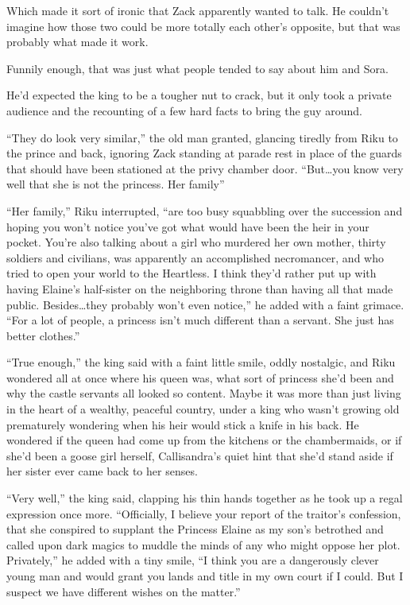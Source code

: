 Which made it sort of ironic that Zack apparently wanted to talk. He couldn't imagine how those two could be more totally each other's opposite, but that was probably what made it work.

Funnily enough, that was just what people tended to say about him and Sora.

He'd expected the king to be a tougher nut to crack, but it only took a private audience and the recounting of a few hard facts to bring the guy around.

``They do look very similar,'' the old man granted, glancing tiredly from Riku to the prince and back, ignoring Zack standing at parade rest in place of the guards that should have been stationed at the privy chamber door. ``But\ldots you know very well that she is not the princess. Her family\textemdash ''

``Her family,'' Riku interrupted, ``are too busy squabbling over the succession and hoping you won't notice you've got what would have been the heir in your pocket. You're also talking about a girl who murdered her own mother, thirty soldiers and civilians, was apparently an accomplished necromancer, and who tried to open your world to the Heartless. I think they'd rather put up with having Elaine's half-sister on the neighboring throne than having all that made public. Besides\ldots they probably won't even notice,'' he added with a faint grimace. ``For a lot of people, a princess isn't much different than a servant. She just has better clothes.''

``True enough,'' the king said with a faint little smile, oddly nostalgic, and Riku wondered all at once where his queen was, what sort of princess she'd been and why the castle servants all looked so content. Maybe it was more than just living in the heart of a wealthy, peaceful country, under a king who wasn't growing old prematurely wondering when his heir would stick a knife in his back. He wondered if the queen had come up from the kitchens or the chambermaids, or if she'd been a goose girl herself, Callisandra's quiet hint that she'd stand aside if her sister ever came back to her senses.

``Very well,'' the king said, clapping his thin hands together as he took up a regal expression once more. ``Officially, I believe your report of the traitor's confession, that she conspired to supplant the Princess Elaine as my son's betrothed and called upon dark magics to muddle the minds of any who might oppose her plot. Privately,'' he added with a tiny smile, ``I think you are a dangerously clever young man and would grant you lands and title in my own court if I could. But I suspect we have different wishes on the matter.''


